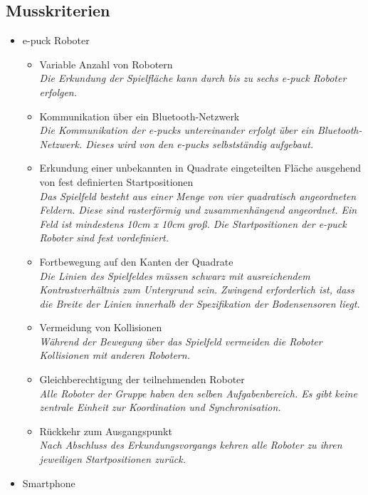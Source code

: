 \documentclass[10pt,a4paper]{article}
\begin{document}
		\subsection{Musskriterien}
			\begin{itemize}
				\item e-puck Roboter
				\begin{itemize}
					\item Variable Anzahl von Robotern
						\\ \textsl{Die Erkundung der Spielfläche kann durch bis zu sechs e-puck Roboter erfolgen.}
					\item Kommunikation über ein Bluetooth-Netzwerk
						\\ \textsl{Die Kommunikation der e-pucks untereinander erfolgt über ein Bluetooth-Netzwerk.
						   Dieses wird von den e-pucks selbstständig aufgebaut.}
					\item Erkundung einer unbekannten in Quadrate eingeteilten Fläche ausgehend von fest definierten Startpositionen
						\\ \textsl{Das Spielfeld besteht aus einer Menge von vier quadratisch angeordneten \gls{Feld}ern. Diese sind rasterförmig und
						   zusammenhängend angeordnet. Ein Feld ist mindestens 10cm x 10cm groß. Die Startpositionen der e-puck Roboter
						   sind fest vordefiniert.}
					\item Fortbewegung auf den Kanten der Quadrate
						\\ \textsl{Die Linien des Spielfeldes müssen schwarz mit ausreichendem Kontrastverhältnis
						    zum Untergrund sein. Zwingend erforderlich ist, dass die Breite der Linien innerhalb der Spezifikation der
							Bodensensoren liegt.}		
					\item Vermeidung von Kollisionen
						\\ \textsl{Während der Bewegung über das Spielfeld vermeiden die Roboter Kollisionen mit anderen Robotern.}	
					\item Gleichberechtigung der teilnehmenden Roboter
						\\ \textsl{Alle Roboter der Gruppe haben den selben Aufgabenbereich. Es gibt keine zentrale Einheit
							zur Koordination und Synchronisation.}	
					\item Rückkehr zum Ausgangspunkt
						\\ \textsl{Nach Abschluss des Erkundungsvorgangs kehren alle Roboter zu ihren jeweiligen Startpositionen
							zurück.}	
				\end{itemize}
				\item Smartphone

\end{itemize}
\end{document}

